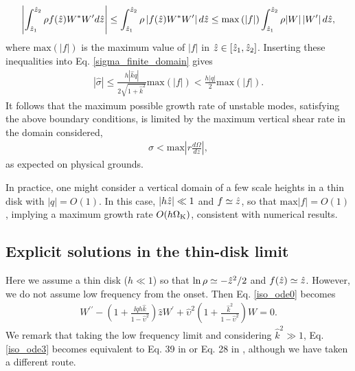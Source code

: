 \begin{align}
  \left|\int_{\hat{z}_1}^{\hat{z}_2}\rho
    f(\hat{z}) W^*W^\prime d\hat{z}\right|\leq \int_{\hat{z}_1}^{\hat{z}_2}\rho
  \left|f(\hat{z})W^*W^\prime \right|d\hat{z}
  \leq
  \mathrm{max}\left(|f|\right)\int_{\hat{z}_1}^{\hat{z}_2}\rho
  |W|\left|W^\prime \right|d\hat{z},
\end{align}
where $\mathrm{max}(|f|)$ is the maximum value of $|f|$ in
$\hat{z}\in[\hat{z}_1,\hat{z}_2]$. Inserting these inequalities into
Eq. \ref{sigma_finite_domain} gives
\begin{align}\label{max_growth}
  |\hat{\sigma}|\leq
  \frac{h |\hat{k} q|}{2\sqrt{1+\hat{k}^2}}\mathrm{max}(|f|) < \frac{h |q|}{2}\mathrm{max}(|f|) . 
\end{align}
It
follows that the maximum possible growth rate of unstable modes,
satisfying the above boundary conditions, is limited by the maximum
vertical shear rate in the domain considered,
\begin{align}
  \sigma < \mathrm{max} \left|r\frac{d\Omega}{dz}\right|, 
\end{align}
as expected on physical grounds. 

In practice, one might consider a vertical domain of a few scale 
heights in a thin disk with $|q|=O(1)$. In this case, $|h\hat{z}|\ll1$ and  
$f\simeq \hat{z}$, so that $\mathrm{max}|f| = O(1)$, implying a
maximum growth rate $O(h \Omega_{\rm K})$, consistent with numerical
results. 


\subsection{Explicit solutions in the thin-disk limit}\label{iso_explicit}
Here we assume a thin disk ($h\ll1$) so that $\ln\rho\simeq
-\hat{z}^2/2$ and $f(\hat{z})\simeq \hat{z}$. However, we do not assume 
low frequency from the onset. Then Eq. \ref{iso_ode0} becomes 
\begin{align}\label{iso_ode3}
  W^{\prime\prime} - \left(1 + \frac{\ii qh \hat{k}}{1-\hat{\upsilon}^2}\right)\hat{z}W^\prime  +
  \hat{\upsilon}^2\left(1+\frac{\hat{k}^2}{1-\hat{\upsilon}^2}\right)W = 0.
\end{align}
We remark that taking the low frequency limit and considering
$\hat{k}^2\gg 1$, Eq. \ref{iso_ode3} becomes equivalent to Eq. 39 in
 or Eq. 28 in , although we have taken a
different route.    
 
